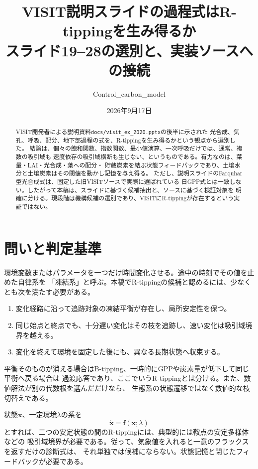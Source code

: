 \documentclass[a4paper,11pt]{ltjsarticle}
\title{VISIT説明スライドの過程式はR-tippingを生み得るか\\
\large スライド19--28の選別と、実装ソースへの接続}
\author{Control\_carbon\_model}
\date{2026年9月17日}
\newcommand{\code}[1]{\nolinkurl{#1}}
\begin{document}
\maketitle
\begin{abstract}
VISIT開発者による説明資料\code{docs/visit_ex_2020.pptx}の後半に示された
光合成、気孔、呼吸、配分、地下部過程の式を、R-tippingを生み得るかという観点から選別した。
結論は、個々の飽和関数、指数関数、最小値演算、一次呼吸だけでは、通常、複数の吸引域も
速度依存の吸引域横断も生じない、というものである。有力なのは、葉量・LAI・光合成・葉への配分・
貯蔵炭素を結ぶ状態フィードバックであり、土壌水分と土壌炭素はその閾値を動かし記憶を与え得る。
ただし、説明スライドのFarquhar型光合成式は、固定した旧VISITソースで実際に選ばれている
日GPP式とは一致しない。したがって本稿は、スライドに基づく候補抽出と、ソースに基づく検証対象を
明確に分ける。現段階は機構候補の選別であり、VISITにR-tippingが存在するという実証ではない。
\end{abstract}
\tableofcontents

\section{問いと判定基準}
環境変数またはパラメータを一つだけ時間変化させる。途中の時刻でその値を止めた自律系を
「凍結系」と呼ぶ。本稿でR-tippingの候補と認めるには、少なくとも次を満たす必要がある。
\begin{enumerate}
\item 変化経路に沿って追跡対象の凍結平衡が存在し、局所安定性を保つ。
\item 同じ始点と終点でも、十分遅い変化はその枝を追跡し、速い変化は吸引域境界を越える。
\item 変化を終えて環境を固定した後にも、異なる長期状態へ収束する。
\end{enumerate}
平衡そのものが消える場合はB-tipping、一時的にGPPや炭素量が低下して同じ平衡へ戻る場合は
過渡応答であり、ここでいうR-tippingとは分ける。また、数値解法が別の代数根を選んだだけなら、
生態系の状態遷移ではなく数値的な枝切替えである\cite{ashwin,feudel}。

状態$\bm x$、一定環境$\lambda$の系を
\begin{equation}
 \dot{\bm x}=\bm f(\bm x;\lambda)
\end{equation}
とすれば、二つの安定状態の間のR-tippingには、典型的には鞍点の安定多様体などの
吸引域境界が必要である。従って、気象値を入れると一意のフラックスを返すだけの診断式は、
それ単独では候補にならない。状態記憶と閉じたフィードバックが必要である。
\end{document}
